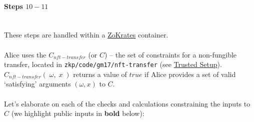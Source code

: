 \documentclass{article}
\begin{document}
\paragraph{Steps $10 - 11$}
\ \\
These steps are handled within a \hyperref[sec:zokrates]{ZoKrates} container.\\
\\
Alice uses the $C_{nft-transfer}$ (or $C$) -- the set of constraints for a non-fungible transfer, located in \texttt{zkp/code/gm17/nft-transfer} (see \hyperref[sec:trustedSetup]{Trusted Setup}). $C_{nft-transfer}(\;\omega,\;x\;)$ returns a value of $true$ if Alice provides a set of valid `satisfying' arguments $(\omega, x)$ to $C$.\\
\\
Let's elaborate on each of the checks and calculations constraining the inputs to $C$ (we highlight public inputs in \textbf{bold} below):
\end{document}

